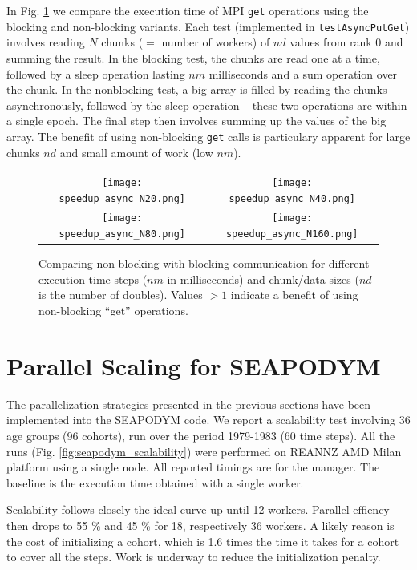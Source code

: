 \documentclass[a4paper,oneside,12pt]{article}
\begin{document}
In Fig. \ref{fig:async} we compare the  execution time of MPI \verb|get| operations using 
the blocking and non-blocking variants. Each test (implemented in \verb|testAsyncPutGet|) involves reading $N$ chunks ($=$ number of workers) 
of $nd$ values from rank 0 and summing the result. In the blocking test, the chunks are read one at a 
time, followed by a sleep operation lasting $nm$ milliseconds and a sum operation over the chunk. 
In the nonblocking test, a big array is filled by reading the chunks asynchronously, followed by the 
sleep operation -- these two operations are within a single epoch. The final step then involves summing up the values
of the big array. The benefit of using non-blocking \verb|get| calls is particulary apparent for large chunks 
$nd$ and small amount of work (low $nm$).

\begin{figure}
\begin{tabular}{cc}
      \texttt{[image: speedup\_async\_N20.png]} & \texttt{[image: speedup\_async\_N40.png]} \\
      \texttt{[image: speedup\_async\_N80.png]} & \texttt{[image: speedup\_async\_N160.png]} \\
\end{tabular}
\caption{Comparing non-blocking with blocking communication for different execution time steps ($nm$ in milliseconds) 
and chunk/data sizes ($nd$ is the number of doubles). Values $> 1$ indicate a benefit of using non-blocking ``get'' operations.}
\label{fig:async}
\end{figure}

\section{Parallel Scaling for SEAPODYM}

The parallelization strategies presented in the previous sections have been implemented into the SEAPODYM code. 
We report a scalability test involving 36 age groups (96 cohorts), run over the period 1979-1983 (60 time steps). 
All the runs (Fig. \ref{fig:seapodym_scalability}) were performed on REANNZ AMD Milan
platform using a single node. All reported timings are for the manager. The baseline is the execution time 
obtained with a single worker.

Scalability follows closely the ideal curve up until 12 workers. Parallel effiency then drops to 55 \% 
and 45 \% for 18, respectively 36 workers. A likely reason is the cost of initializing a cohort, which is 1.6 times
the time it takes for a cohort to cover all the steps. Work is underway to reduce the initialization penalty.
\end{document}
